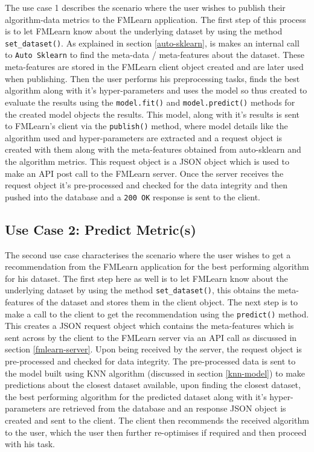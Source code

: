 The use case 1 describes the scenario where the user wishes to publish their algorithm-data metrics to the FMLearn application. The first step of this process is to let FMLearn know about the underlying dataset by using the method \texttt{set\_dataset()}. As explained in section \ref{auto-sklearn}, is makes an internal call to \texttt{Auto Sklearn} to find the meta-data / meta-features about the dataset. These meta-features are stored in the FMLearn client object created and are later used when publishing. Then the user performs his preprocessing tasks, finds the best algorithm along with it's hyper-parameters and uses the model so thus created to evaluate the results using the \texttt{model.fit()} and \texttt{model.predict()} methods for the created model objects the results. This model, along with it's results is sent to FMLearn's client via the \texttt{publish()} method, where model details like the algorithm used and hyper-parameters are extracted and a request object is created with them along with the meta-features obtained from auto-sklearn and the algorithm metrics. This request object is a JSON object which is used to make an API post call to the FMLearn server. Once the server receives the request object it's pre-processed and checked for the data integrity and then pushed into the database and a \texttt{200 OK} response is sent to the client.

\subsection*{Use Case 2: Predict Metric(s)}

The second use case characterises the scenario where the user wishes to get a recommendation from the FMLearn application for the best performing algorithm for his dataset. The first step here as well is to let FMLearn know about the underlying dataset by using the method \texttt{set\_dataset()}, this obtains the meta-features of the dataset and stores them in the client object. The next step is to make a call to the client to get the recommendation using the \texttt{predict()} method. This creates a JSON request object which contains the meta-features which is sent across by the client to the FMLearn server via an API call as discussed in section \ref{fmlearn-server}. Upon being received by the server, the request object is pre-processed and checked for data integrity. The pre-processed data is sent to the model built using KNN algorithm (discussed in section \ref{knn-model}) to make predictions about the closest dataset available, upon finding the closest dataset, the best performing algorithm for the predicted dataset along with it's hyper-parameters are retrieved from the database and an response JSON object is created and sent to the client. The client then recommends the received algorithm to the user, which the user then further re-optimises if required and then proceed with his task.


